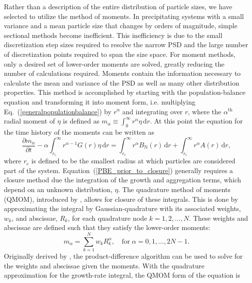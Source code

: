 \documentclass[preprint,3p,a4paper,times,12pt,authoryear]{elsarticle}
\begin{document}
Rather than a description of the entire distribution of particle sizes, we have selected to utilize the method of moments. In precipitating systems with a small variance and a mean particle size that changes by orders of magnitude, simple sectional methods become inefficient. This inefficiency is due to the small discretization step sizes required to resolve the narrow PSD and the large number of discretization points required to span the size space. For moment methods, only a desired set of lower-order moments are solved, greatly reducing the number of calculations required. Moments contain the information necessary to calculate the mean and variance of the PSD as well as many other distribution properties. This method is accomplished by starting with the population-balance equation and transforming it into moment form, i.e. multiplying Eq.~(\ref{generalpopulationbalance}) by $r^\alpha$ and integrating over $r$, where the $\alpha^{\text{th}}$ radial moment of $\eta$ is defined as $m_{\alpha} \equiv \int_0^\infty r^\alpha \eta \, \mathrm{d}r$.  At this point the equation for the time history of the moments can be written as
\begin{equation}\label{PBE_prior_to_closure}
\frac{\partial m_\alpha}{\partial t}  - \alpha \int_{r_{\text{c}}}^\infty r^{\alpha - 1} G(r) \eta\, \mathrm{d}r =  \int_{r_{\text{c}}}^\infty r^\alpha B_{\text{N}}(r) \, \mathrm{d}r + \int_{r_{\text{c}}}^\infty r^\alpha A(r) \, \mathrm{d}r,
\end{equation}
where $r_{\text{c}}$ is defined to be the smallest radius at which particles are considered part of the system. Equation~(\ref{PBE_prior_to_closure}) generally requires a closure method due the integration of the growth and aggregation terms, which depend on an unknown distribution, $\eta$.  The quadrature method of moments (QMOM), introduced by \citet{McGraw1997}, allows for closure of these integrals. This is done by approximating the integral by Gaussian-quadrature with its associated weights, $w_k$, and abscissae, $R_k$, for each quadrature node $k = 1, 2, \dots, N$. These weights and abscissae are defined such that they satisfy the  lower-order moments:
\begin{equation}
m_\alpha = \sum_{k=1}^N w_k R_k^\alpha, \quad \text{for} \; \alpha = 0,1, \dots , 2N - 1 .
\end{equation} 
Originally derived by \citet{Gordon1968}, the product-difference algorithm can be used to solve for the weights and abscissae given the moments.  With the quadrature approximation for the growth-rate integral, the QMOM form of the equation is
\end{document}
